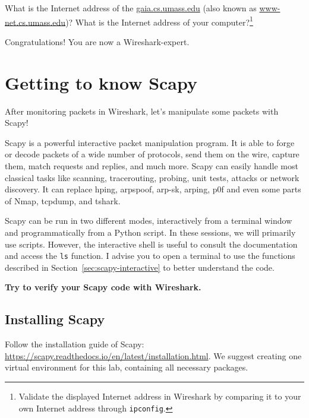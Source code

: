 \documentclass[11pt,a4paper]{article}
\begin{document}
\begin{question}
    What is the Internet address of the \url{gaia.cs.umass.edu} (also known as \url{www-net.cs.umass.edu})? What is the Internet address of your computer?\footnote{Validate the displayed Internet address in Wireshark by comparing it to your own Internet address through \texttt{ipconfig}.}
\end{question}

Congratulations! You are now a Wireshark-expert.

\FloatBarrier
\section{Getting to know Scapy}\label{sec:getting-to-know-scapy}
After monitoring packets in Wireshark, let's manipulate some packets with Scapy!

Scapy is a powerful interactive packet manipulation program. It is able to forge or decode packets of a wide number of protocols, send them on the wire, capture them, match requests and replies, and much more. Scapy can easily handle most classical tasks like scanning, tracerouting, probing, unit tests, attacks or network discovery. It can replace hping, arpspoof, arp-sk, arping, p0f and even some parts of Nmap, tcpdump, and tshark.

Scapy can be run in two different modes, interactively from a terminal window and programmatically from a Python script. 
In these sessions, we will primarily use scripts. However, the interactive shell is useful to consult the documentation and  access the \texttt{ls} function. I advise you to open a terminal to use the functions described in Section~\ref{sec:scapy-interactive} to better understand the code. 

\textbf{Try to verify your Scapy code with Wireshark.}


\subsection{Installing Scapy}

Follow the installation guide of Scapy: \url{https://scapy.readthedocs.io/en/latest/installation.html}.
We suggest creating one virtual environment for this lab, containing all necessary packages. 
\end{document}
